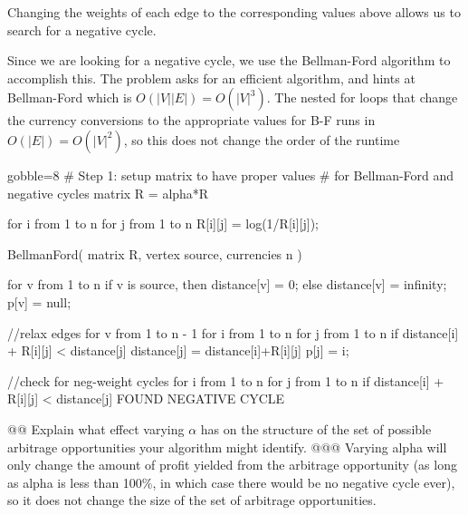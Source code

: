 \documentclass[10pt]{article}\usepackage[]{graphicx}\usepackage[]{xcolor}
\begin{document}
\begin{easylist}[enumerate]
    Changing the weights of each edge to the corresponding values above allows us to search for a negative cycle.

    Since we are looking for a negative cycle, we use the Bellman-Ford algorithm to accomplish this.  The problem asks
    for an efficient algorithm, and hints at Bellman-Ford which is $O(|V||E|) = O(|V|^3)$.  The nested for loops that
    change the currency conversions to the appropriate values for B-F runs in $O(|E|) = O(|V|^2)$, so this does not
    change the order of the runtime

    \begin{pythoncode*}{gobble=8}
        # Step 1: setup matrix to have proper values
        #         for Bellman-Ford and negative cycles
        matrix R = alpha*R

        for i from 1 to n {
          for j from 1 to n {
            R[i][j] = log(1/R[i][j]);
          }
        }

        BellmanFord( matrix R, vertex source, currencies n ){
          for v from 1 to n{
            if v is source, then distance[v] = 0;
            else distance[v] = infinity;
            p[v] = null;
          }

          //relax edges
          for v from 1 to n - 1{
            for i from 1 to n{
              for j from 1 to n{
                if distance[i] + R[i][j] < distance[j]
                  distance[j] = distance[i]+R[i][j]
                  p[j] = i;
              }
            }
          }

          //check for neg-weight cycles
          for i from 1 to n {
            for j from 1 to n {
              if distance[i] + R[i][j] < distance[j]
                FOUND NEGATIVE CYCLE
            }
          }
        }
    \end{pythoncode*}

    @@ Explain what effect varying $\alpha$ has on the structure of the set of possible arbitrage opportunities your
    algorithm might identify.
    @@@ Varying alpha will only change the amount of profit yielded from the arbitrage opportunity (as long as alpha is
    less than 100\%, in which case there would be no negative cycle ever), so it does not change the size of the set of
    arbitrage opportunities.
\end{easylist}
\end{document}

